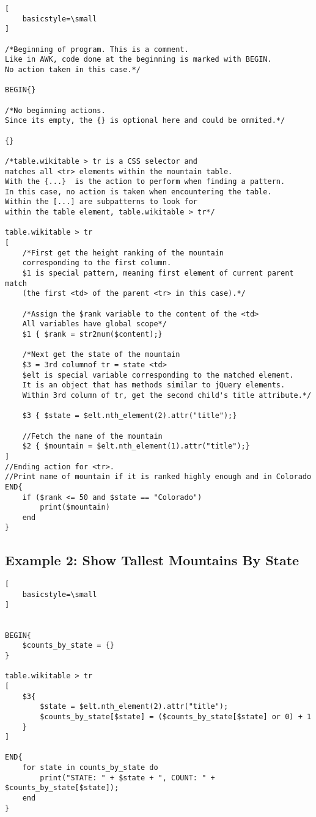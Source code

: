\documentclass[12pt]{article}
\begin{document}
\begin{lstlisting}[
    basicstyle=\small
]

/*Beginning of program. This is a comment.
Like in AWK, code done at the beginning is marked with BEGIN.
No action taken in this case.*/

BEGIN{}

/*No beginning actions.
Since its empty, the {} is optional here and could be ommited.*/

{}

/*table.wikitable > tr is a CSS selector and
matches all <tr> elements within the mountain table.
With the {...}  is the action to perform when finding a pattern.
In this case, no action is taken when encountering the table.
Within the [...] are subpatterns to look for 
within the table element, table.wikitable > tr*/

table.wikitable > tr
[
	/*First get the height ranking of the mountain
	corresponding to the first column.
	$1 is special pattern, meaning first element of current parent match
	(the first <td> of the parent <tr> in this case).*/

	/*Assign the $rank variable to the content of the <td>
	All variables have global scope*/
	$1 { $rank = str2num($content);}

	/*Next get the state of the mountain
	$3 = 3rd columnof tr = state <td>
	$elt is special variable corresponding to the matched element.
	It is an object that has methods similar to jQuery elements.
	Within 3rd column of tr, get the second child's title attribute.*/
	
	$3 { $state = $elt.nth_element(2).attr("title");}

	//Fetch the name of the mountain
	$2 { $mountain = $elt.nth_element(1).attr("title");}
]
//Ending action for <tr>.
//Print name of mountain if it is ranked highly enough and in Colorado
END{
	if ($rank <= 50 and $state == "Colorado")
		print($mountain)
	end
}
\end{lstlisting}

\subsection*{Example 2: Show Tallest Mountains By State}

\begin{lstlisting}[
    basicstyle=\small
]


BEGIN{
	$counts_by_state = {}
}

table.wikitable > tr
[
	$3{
		$state = $elt.nth_element(2).attr("title");
		$counts_by_state[$state] = ($counts_by_state[$state] or 0) + 1
	}
]

END{
	for state in counts_by_state do
		print("STATE: " + $state + ", COUNT: " + $counts_by_state[$state]);
	end
}

\end{lstlisting}
\end{document}
